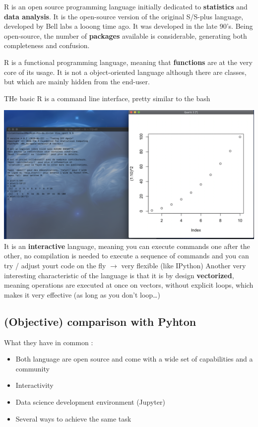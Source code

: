 \documentclass[
]{book}
\providecommand{\tightlist}{%
  \setlength{\itemsep}{0pt}\setlength{\parskip}{0pt}}
\begin{document}
R is an open source programming language initially dedicated to \textbf{statistics} and \textbf{data analysis}. It is the open-source version of the original S/S-plus language, developed by Bell labs a looong time ago. It was developed in the late 90's. Being open-source, the number of \textbf{packages} available is considerable, generating both completeness and confusion.

R is a functional programming language, meaning that \textbf{functions} are at the very core of its usage. It is not a object-oriented language although there are classes, but which are mainly hidden from the end-user.

THe basic R is a command line interface, pretty similar to the bash

\includegraphics{img/r-console.png}
It is an \textbf{interactive} language, meaning you can execute commands one after the other, no compilation is needed to execute a sequence of commands and you can try / adjust yourt code on the fly \(\rightarrow\) very flexible (like IPython)
Another very interesting characteristic of the language is that it is by design \textbf{vectorized}, meaning operations are executed at once on vectors, without explicit loops, which makes it very effective (as long as you don't loop\ldots)

\hypertarget{objective-comparison-with-pyhton}{%
\subsection{(Objective) comparison with Pyhton}\label{objective-comparison-with-pyhton}}

What they have in common :

\begin{itemize}
\tightlist
\item
  Both language are open source and come with a wide set of capabilities and a community
\item
  Interactivity
\item
  Data science development environment (Jupyter)
\item
  Several ways to achieve the same task
\end{itemize}
\end{document}
